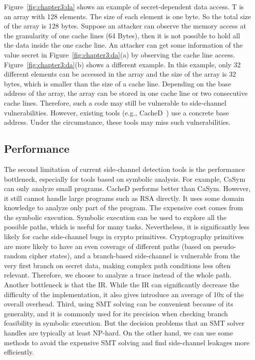 Figure~\ref{fig:chapter3:da} shows an example of secret-dependent data access. \textsf{T} is an array with 128 elements. The size of each element is one byte. So the total size of the array is 128 bytes. Suppose an attacker can observe the memory access at the granularity of one cache lines (64 Bytes), then it is not possible to hold all the data inside the one cache line. An attacker can get some information of the value \textsf{secret} in Figure~\ref{fig:chapter3:da}(a) by observing the cache line access. Figure~\ref{fig:chapter3:da}(b) shows a different example. In this example, only 32 different elements can be accessed in the array and the size of the array is 32 bytes, which is smaller than the size of a cache line. Depending on the base address of the array, the array can be stored in one cache line or two consecutive cache lines. Therefore, such a code may still be vulnerable to side-channel vulnerabilities. However, existing tools (e.g., CacheD~\cite{203878}) use a concrete base address. Under the circumstance, these tools may miss such vulnerabilities.

\subsection{Performance}
The second limitation of current side-channel detection tools is the performance bottleneck, especially for tools based on symbolic analysis. For example, CaSym~\cite{Brotzman19Casym} can only analyze small programs. CacheD performs better than CaSym. However, it still cannot handle large programs such as RSA directly. It uses some domain knowledge to analyze only part of the program. The expensive cost comes from the symbolic execution. Symbolic execution can be used to explore all the possible paths, which is useful for many tasks.
Nevertheless, it is significantly less likely for cache side-channel bugs in crypto primitives. Cryptography primitives are more likely to have an even coverage of different paths (based on pseudo-random cipher states), and a branch-based side-channel is vulnerable from the very first branch on secret data, making complex path conditions less often relevant. Therefore, we choose to analyze a trace instead of the whole path. Another bottleneck is that the IR. While the IR can significantly decrease the difficulty of the implementation, it also gives introduce an average of 10x of the overall overhead. Third, using SMT solving can be convenient because of its generality, and it is commonly used for its precision when checking branch feasibility in symbolic execution. But the decision problems that an SMT solver handles are typically at least NP-hard. On the other hand, we can use some methods to avoid the expensive SMT solving and find side-channel leakages more efficiently.

